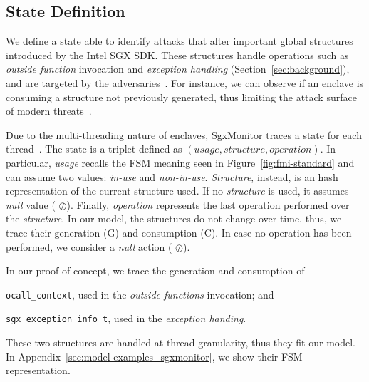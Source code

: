 \subsection{State Definition}
\label{ssec:state}

We define a state able to identify attacks that alter important global 
structures introduced by the Intel SGX SDK.
These structures handle operations such as \emph{outside function} 
invocation and \emph{exception handling} 
(Section~\ref{sec:background}), and are targeted by the 
adversaries~\citep{biondo2018guard,lee2017hacking}.
For instance, we can observe if an enclave is consuming a structure not 
previously generated, thus limiting the attack surface of 
modern threats~\citep{biondo2018guard,lee2017hacking}.

Due to the multi-threading nature of enclaves, SgxMonitor 
traces a state for each thread~\citep{intel-developer-guide}.
The state is a triplet defined as $(usage, structure, operation)$.
In particular, \emph{usage} recalls the FSM meaning seen in 
Figure~\ref{fig:fmi-standard} and can assume two values: \emph{in-use} and 
\emph{non-in-use}.
\emph{Structure}, instead, is an hash representation of the current structure 
used. If no \emph{structure} is used, it assumes \emph{null} value (\ie 
$\oslash$).
Finally, \emph{operation} represents the last operation performed over the 
\emph{structure}. In our model, the structures do not change over time, thus, 
we trace their generation (\ie G) and consumption (\ie C).
In case no operation has been performed, we consider a \emph{null} action (\ie 
$\oslash$).

In our proof of concept, we trace the generation and consumption of
\begin{enumerate*}[label=(\roman*)]
	\item \texttt{ocall\_context}, used in the \emph{outside 
		functions} invocation; and
	\item \texttt{sgx\_exception\_info\_t}, used in the 	
	\emph{exception handing}.
\end{enumerate*} 
These two structures are handled at thread granularity, thus they fit 
our model.
In Appendix~\ref{sec:model-examples_sgxmonitor}, we show their FSM 
representation.


